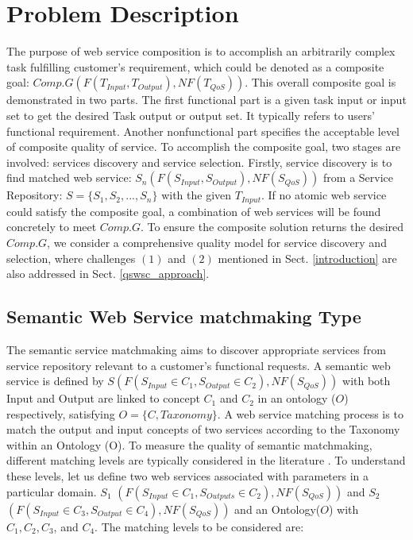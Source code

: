 \documentclass{llncs}
\begin{document}
\section{Problem Description}\label{problemDes}

The purpose of web service composition is to accomplish an arbitrarily complex task fulfilling customer's requirement, which could be denoted as a composite goal: $Comp.G(F(T_{Input}, T_{Output}), NF(T_{QoS}))$. This overall composite goal is demonstrated in two parts. The first functional part is a given task input or input set to get the desired Task output or output set. It typically refers to users' functional requirement. Another nonfunctional part specifies the acceptable level of composite quality of service. To accomplish the composite goal, two stages are involved: services discovery and service selection. Firstly, service discovery is to find matched web service: $S_{n}(F(S_{Input}, S_{Output}), NF(S_{QoS}))$ from a Service Repository: $S =  \{S_{1}, S_{2},..., S_{n} \}$ with the given $T_{Input}$. If no atomic web service could satisfy the composite goal, a combination of web services will be found concretely to meet $Comp.G$. To ensure the composite solution returns the desired $Comp.G$, we consider a comprehensive quality model for service discovery and selection, where challenges $(1)$ and $(2)$ mentioned in Sect. \ref{introduction} are also addressed in Sect. \ref{qswsc_approach}.

\subsection{Semantic Web Service matchmaking Type}\label{semantic Web service Discovery}
The semantic service matchmaking aims to discover appropriate services from service repository relevant to a customer's functional requests. A semantic web service is defined by $S(F(S_{Input}\in C_{1}, S_{Output}\in C_{2}), NF(S_{QoS}))$ with both Input and Output are linked to concept $C_{1}$ and $C_{2}$ in an ontology ($O$) respectively, satisfying $O=\{C, Taxonomy\}$. A web service matching process is to match the output and input concepts of two services according to the Taxonomy within an Ontology (O). To measure the quality of semantic matchmaking, different matching levels are typically considered in the literature \cite{paolucci2002semantic}. To understand these levels, let us define two web services associated with parameters in a particular domain. $S_{1}$ $(F(S_{Input}\in C_{1}, S_{Outputs}\in C_{2}), NF(S_{QoS}))$ and  $S_{2}$ $(F(S_{Input}\in C_{3}, S_{Output}\in C_{4}), NF(S_{QoS}))$ and an Ontology($O$) with $C_{1},C_{2},C_{3}$, and $C_{4}$. The matching levels to be considered are:
\end{document}
